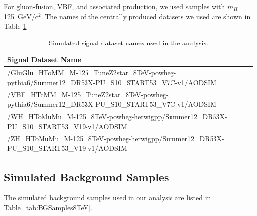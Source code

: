 \documentclass[12pt]{article}
\begin{document}
For gluon-fusion, VBF, and associated production, we used samples with $m_H =$ 125~$\textrm{GeV}/\textrm{c}^{2}$. 
The names of the centrally produced datasets we used are shown in Table \ref{tab:sigDatasets}

\begin{table}[htb]
\caption{Simulated signal dataset names used in the analysis.
\label{tab:sigDatasets}
}
\small
\begin{center}
\begin{tabular}{ |p{12cm}|}
\hline
Signal Dataset Name \\
\hline
\hline
/GluGlu\_HToMM\_M-125\_TuneZ2star\_8TeV-powheg-pythia6/Summer12\_DR53X-PU\_S10\_START53\_V7C-v1/AODSIM \\
\hline
/VBF\_HToMM\_M-125\_TuneZ2star\_8TeV-powheg-pythia6/Summer12\_DR53X-PU\_S10\_START53\_V7C-v1/AODSIM \\
\hline
/WH\_HToMuMu\_M-125\_8TeV-powheg-herwigpp/Summer12\_DR53X-PU\_S10\_START53\_V19-v1/AODSIM \\
\hline
/ZH\_HToMuMu\_M-125\_8TeV-powheg-herwigpp/Summer12\_DR53X-PU\_S10\_START53\_V19-v1/AODSIM \\
\hline
\end{tabular}
\end{center}
\end{table}


\subsection{Simulated Background Samples}

The simulated background samples used in our analysis are listed in 
Table~\ref{tab:BGSamples8TeV}.
\end{document}
